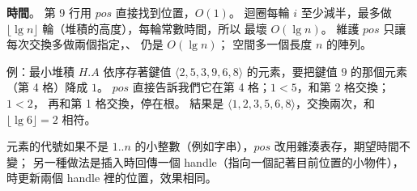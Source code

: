 \begin{pastsoln}
\textbf{時間}。 第 9 行用 $\mathit{pos}$ 直接找到位置，$O(1)$。 迴圈每輪 $i$ 至少減半，最多做
$\lfloor \lg n \rfloor$ 輪（堆積的高度），每輪常數時間，所以  最壞 $O(\lg n)$。
維護 $\mathit{pos}$ 只讓每次交換多做兩個指定，、 仍是 $O(\lg n)$；
空間多一個長度 $n$ 的陣列。

例：最小堆積 $H.A$ 依序存著鍵值 $\langle 2, 5, 3, 9, 6, 8 \rangle$ 的元素，要把鍵值 $9$ 的那個元素
（第 4 格）降成 $1$。 $\mathit{pos}$ 直接告訴我們它在第 4 格；$1 < 5$，和第 2 格交換；$1 < 2$，
再和第 1 格交換，停在根。 結果是 $\langle 1, 2, 3, 5, 6, 8 \rangle$，交換兩次，和 $\lfloor \lg 6 \rfloor = 2$
相符。

元素的代號如果不是 $1..n$ 的小整數（例如字串），$\mathit{pos}$ 改用雜湊表存，期望時間不變；
另一種做法是插入時回傳一個 handle（指向一個記著目前位置的小物件）， 時更新兩個
handle 裡的位置，效果相同。
\end{pastsoln}

